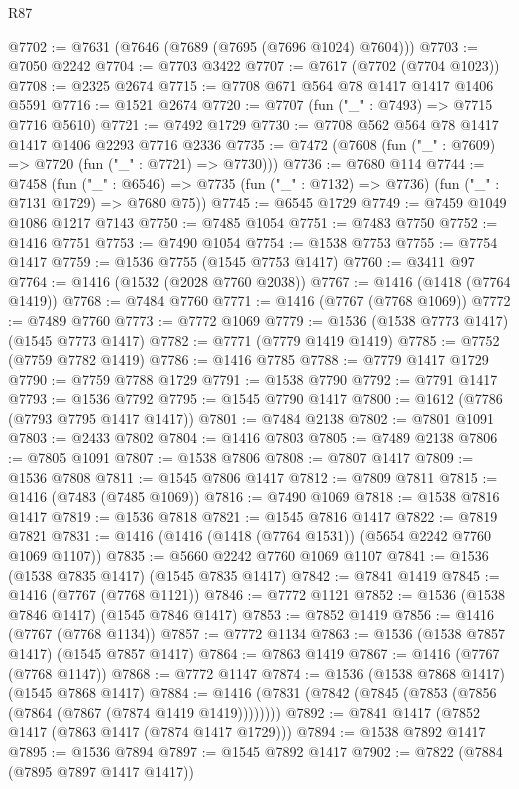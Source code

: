 \begin{lexlean}{R87}
\begin{coremodule}
{{@7702 := @7631 (@7646 (@7689 (@7695 (@7696 @1024) @7604)))
@7703 := @7050 @2242
@7704 := @7703 @3422
@7707 := @7617 (@7702 (@7704 @1023))
@7708 := @2325 @2674
@7715 := @7708 @671 @564 @78 @1417 @1417 @1406 @5591
@7716 := @1521 @2674
@7720 := @7707 (fun ("_" : @7493) => @7715 @7716 @5610)
@7721 := @7492 @1729
@7730 := @7708 @562 @564 @78 @1417 @1417 @1406 @2293 @7716 @2336
@7735 := @7472 (@7608 (fun ("_" : @7609) => @7720 (fun ("_" : @7721) => @7730)))
@7736 := @7680 @114
@7744 := @7458
    (fun ("_" : @6546) => @7735 (fun ("_" : @7132) => @7736) (fun ("_" : @7131 @1729) => @7680 @75))
@7745 := @6545 @1729
@7749 := @7459 @1049 @1086 @1217 @7143
@7750 := @7485 @1054
@7751 := @7483 @7750
@7752 := @1416 @7751
@7753 := @7490 @1054
@7754 := @1538 @7753
@7755 := @7754 @1417
@7759 := @1536 @7755 (@1545 @7753 @1417)
@7760 := @3411 @97
@7764 := @1416 (@1532 (@2028 @7760 @2038))
@7767 := @1416 (@1418 (@7764 @1419))
@7768 := @7484 @7760
@7771 := @1416 (@7767 (@7768 @1069))
@7772 := @7489 @7760
@7773 := @7772 @1069
@7779 := @1536 (@1538 @7773 @1417) (@1545 @7773 @1417)
@7782 := @7771 (@7779 @1419 @1419)
@7785 := @7752 (@7759 @7782 @1419)
@7786 := @1416 @7785
@7788 := @7779 @1417 @1729
@7790 := @7759 @7788 @1729
@7791 := @1538 @7790
@7792 := @7791 @1417
@7793 := @1536 @7792
@7795 := @1545 @7790 @1417
@7800 := @1612 (@7786 (@7793 @7795 @1417 @1417))
@7801 := @7484 @2138
@7802 := @7801 @1091
@7803 := @2433 @7802
@7804 := @1416 @7803
@7805 := @7489 @2138
@7806 := @7805 @1091
@7807 := @1538 @7806
@7808 := @7807 @1417
@7809 := @1536 @7808
@7811 := @1545 @7806 @1417
@7812 := @7809 @7811
@7815 := @1416 (@7483 (@7485 @1069))
@7816 := @7490 @1069
@7818 := @1538 @7816 @1417
@7819 := @1536 @7818
@7821 := @1545 @7816 @1417
@7822 := @7819 @7821
@7831 := @1416 (@1416 (@1418 (@7764 @1531)) (@5654 @2242 @7760 @1069 @1107))
@7835 := @5660 @2242 @7760 @1069 @1107
@7841 := @1536 (@1538 @7835 @1417) (@1545 @7835 @1417)
@7842 := @7841 @1419
@7845 := @1416 (@7767 (@7768 @1121))
@7846 := @7772 @1121
@7852 := @1536 (@1538 @7846 @1417) (@1545 @7846 @1417)
@7853 := @7852 @1419
@7856 := @1416 (@7767 (@7768 @1134))
@7857 := @7772 @1134
@7863 := @1536 (@1538 @7857 @1417) (@1545 @7857 @1417)
@7864 := @7863 @1419
@7867 := @1416 (@7767 (@7768 @1147))
@7868 := @7772 @1147
@7874 := @1536 (@1538 @7868 @1417) (@1545 @7868 @1417)
@7884 := @1416 (@7831 (@7842 (@7845 (@7853 (@7856 (@7864 (@7867 (@7874 @1419 @1419))))))))
@7892 := @7841 @1417 (@7852 @1417 (@7863 @1417 (@7874 @1417 @1729)))
@7894 := @1538 @7892 @1417
@7895 := @1536 @7894
@7897 := @1545 @7892 @1417
@7902 := @7822 (@7884 (@7895 @7897 @1417 @1417))
}}
\end{coremodule}
\end{lexlean}
